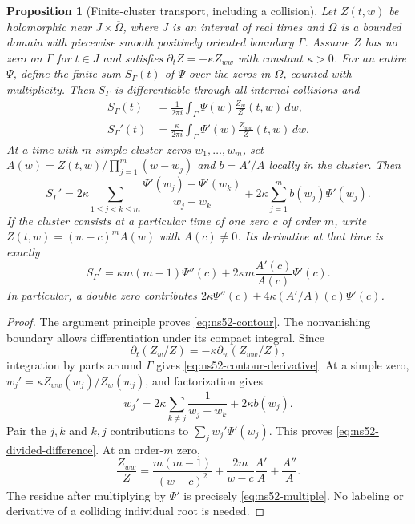 \documentclass[11pt]{article}
\newtheorem{proposition}[theorem]{Proposition}
\theoremstyle{remark}
\begin{document}
\begin{proposition}[Finite-cluster transport, including a collision]
\label{prop:ns52-cluster}
Let $Z(t,w)$ be holomorphic near $J\times\overline\Omega$, where
$J$ is an interval of real times and $\Omega$ is a bounded domain
with piecewise smooth positively oriented boundary $\Gamma$.
Assume $Z$ has no zero on $\Gamma$ for $t\in J$ and satisfies
$\partial_t Z=-\kappa Z_{ww}$ with constant $\kappa>0$.
For an entire $\Psi$, define the finite sum $S_\Gamma(t)$ of
$\Psi$ over the zeros in $\Omega$, counted with multiplicity.
Then $S_\Gamma$ is differentiable through all internal collisions and
\begin{align}
 S_\Gamma(t)&=\frac1{2\pi i}\int_\Gamma
                   \Psi(w)\frac{Z_w}{Z}(t,w)\,dw,
                   \label{eq:ns52-contour}\\
 S_\Gamma'(t)&=\frac{\kappa}{2\pi i}\int_\Gamma
                   \Psi'(w)\frac{Z_{ww}}{Z}(t,w)\,dw.
                   \label{eq:ns52-contour-derivative}
\end{align}
At a time with $m$ simple cluster zeros $w_1,\ldots,w_m$, set
$A(w)=Z(t,w)/\prod_{j=1}^m(w-w_j)$ and $b=A'/A$ locally in
the cluster. Then
\begin{equation}\label{eq:ns52-divided-difference}
 S_\Gamma'
 =2\kappa\sum_{1\le j<k\le m}
       \frac{\Psi'(w_j)-\Psi'(w_k)}{w_j-w_k}
   +2\kappa\sum_{j=1}^m b(w_j)\Psi'(w_j).
\end{equation}
If the cluster consists at a particular time of one zero $c$ of
order $m$, write $Z(t,w)=(w-c)^m A(w)$ with $A(c)\ne0$. Its
derivative at that time is exactly
\begin{equation}\label{eq:ns52-multiple}
 S_\Gamma'=
 \kappa m(m-1)\Psi''(c)
       +2\kappa m\frac{A'(c)}{A(c)}\Psi'(c).
\end{equation}
In particular, a double zero contributes
$2\kappa\Psi''(c)+4\kappa(A'/A)(c)\Psi'(c)$.
\end{proposition}
\begin{proof}
The argument principle proves \eqref{eq:ns52-contour}. The nonvanishing
boundary allows differentiation under its compact integral. Since
\[
 \partial_t(Z_w/Z)=-\kappa\partial_w(Z_{ww}/Z),
\]
integration by parts around $\Gamma$ gives
\eqref{eq:ns52-contour-derivative}. At a simple zero,
$w_j'=\kappa Z_{ww}(w_j)/Z_w(w_j)$, and factorization gives
\[
 w_j'=2\kappa\sum_{k\ne j}\frac1{w_j-w_k}
                         +2\kappa b(w_j).
\]
Pair the $j,k$ and $k,j$ contributions to $\sum_jw_j'\Psi'(w_j)$.
This proves \eqref{eq:ns52-divided-difference}. At an order-$m$ zero,
\[
 \frac{Z_{ww}}Z=\frac{m(m-1)}{(w-c)^2}
       +\frac{2m}{w-c}\frac{A'}A+\frac{A''}A.
\]
The residue after multiplying by $\Psi'$ is precisely
\eqref{eq:ns52-multiple}. No labeling or derivative of a colliding
individual root is needed.
\end{proof}
\end{document}
